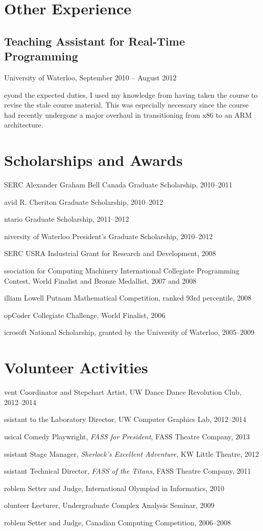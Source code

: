 \documentclass[12pt,letterpaper,oneside]{article}
\def\star#1\par{\begin{itemize}\def\star{\item}\star#1\end{itemize}\par\penalty-1000}
\def\entry#1{\subsection*{#1}}
\def\paragraph#1\par{\begin{itemize}\item[]#1\end{itemize}}
\let\oldsection\section
\def\section#1{\oldsection*{#1}}
\begin{document}
\section{Other Experience}



\entry{Teaching Assistant for Real-Time Programming}
University of Waterloo,
September 2010 -- August 2012
\paragraph
Beyond the expected duties,
I used my knowledge from having taken the course
to revise the stale course material.
This was especially necessary since the course had recently
undergone a major overhaul in transitioning from
x86 to an ARM architecture.

\section{Scholarships and Awards}

\star NSERC Alexander Graham Bell Canada Graduate Scholarship, 2010--2011
\star David R. Cheriton Graduate Scholarship, 2010--2012
\star Ontario Graduate Scholarship, 2011--2012
\star University of Waterloo President's Graduate Scholarship, 2010--2012
\star NSERC USRA Industrial Grant for Research and Development, 2008
\star Association for Computing Machinery
  International Collegiate Programming Contest,
  World Finalist and Bronze Medallist,
  2007 and 2008
\star William Lowell Putnam Mathematical Competition,
  ranked 93rd percentile, 2008
\star TopCoder Collegiate Challenge, World Finalist, 2006
\star Microsoft National Scholarship,
  granted by the University of Waterloo, 2005--2009





\section{Volunteer Activities}

\star Event Coordinator and Stepchart Artist,
  UW Dance Dance Revolution Club, 2012--2014
\star Assistant to the Laboratory Director,
  UW Computer Graphics Lab, 2012--2014
\star Musical Comedy Playwright, \textit{FASS for President},
  FASS Theatre Company, 2013
\star Assistant Stage Manager, \textit{Sherlock's Excellent Adventure},
  KW Little Theatre, 2012
\star Assistant Technical Director, \textit{FASS of the Titans},
  FASS Theatre Company, 2011
\star Problem Setter and Judge,
  International Olympiad in Informatics, 2010
\star Volunteer Lecturer,
  Undergraduate Complex Analysis Seminar, 2009
\star Problem Setter and Judge,
  Canadian Computing Competition, 2006--2008

\end{document}
